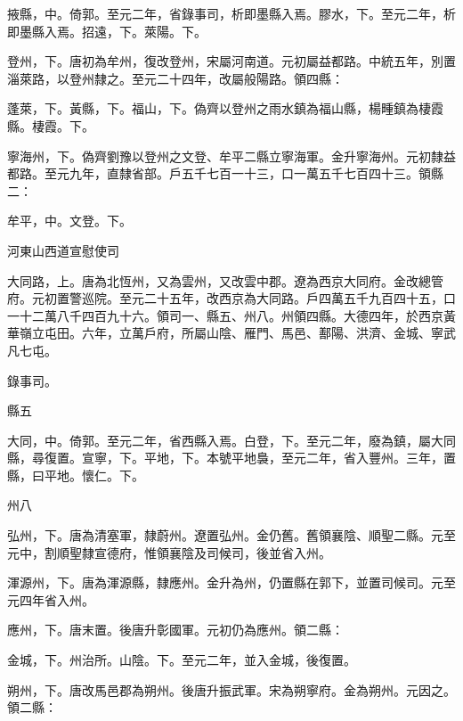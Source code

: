 \begin{pinyinscope}
 掖縣，中。倚郭。至元二年，省錄事司，析即墨縣入焉。膠水，下。至元二年，析即墨縣入焉。招遠，下。萊陽。下。



 登州，下。唐初為牟州，復改登州，宋屬河南道。元初屬益都路。中統五年，別置淄萊路，以登州隸之。至元二十四年，改屬般陽路。領四縣：



 蓬萊，下。黃縣，下。福山，下。偽齊以登州之雨水鎮為福山縣，楊畽鎮為棲霞縣。棲霞。下。



 寧海州，下。偽齊劉豫以登州之文登、牟平二縣立寧海軍。金升寧海州。元初隸益都路。至元九年，直隸省部。戶五千七百一十三，口一萬五千七百四十三。領縣二：



 牟平，中。文登。下。



 河東山西道宣慰使司



 大同路，上。唐為北恆州，又為雲州，又改雲中郡。遼為西京大同府。金改總管府。元初置警巡院。至元二十五年，改西京為大同路。戶四萬五千九百四十五，口一十二萬八千四百九十六。領司一、縣五、州八。州領四縣。大德四年，於西京黃華嶺立屯田。六年，立萬戶府，所屬山陰、雁門、馬邑、鄯陽、洪濟、金城、寧武凡七屯。



 錄事司。



 縣五



 大同，中。倚郭。至元二年，省西縣入焉。白登，下。至元二年，廢為鎮，屬大同縣，尋復置。宣寧，下。平地，下。本號平地裊，至元二年，省入豐州。三年，置縣，曰平地。懷仁。下。



 州八



 弘州，下。唐為清塞軍，隸蔚州。遼置弘州。金仍舊。舊領襄陰、順聖二縣。元至元中，割順聖隸宣德府，惟領襄陰及司候司，後並省入州。



 渾源州，下。唐為渾源縣，隸應州。金升為州，仍置縣在郭下，並置司候司。元至元四年省入州。



 應州，下。唐末置。後唐升彰國軍。元初仍為應州。領二縣：



 金城，下。州治所。山陰。下。至元二年，並入金城，後復置。



 朔州，下。唐改馬邑郡為朔州。後唐升振武軍。宋為朔寧府。金為朔州。元因之。領二縣：




\end{pinyinscope}
